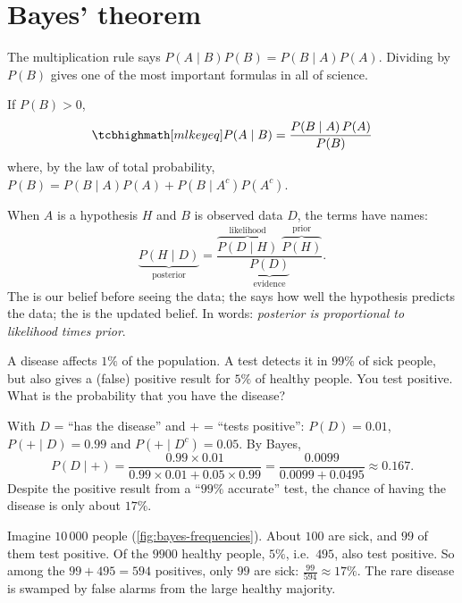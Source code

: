 \section{Bayes' theorem}\label{sec:bayes}

The multiplication rule says $P(A \mid B)P(B) = P(B \mid A)P(A)$. Dividing by
$P(B)$ gives one of the most important formulas in all of science.

\begin{theorem}\label{thm:bayes}
If $P(B) > 0$,
\[
  \keyeq{P(A \mid B) = \frac{P(B \mid A)\,P(A)}{P(B)}}
\]
where, by the law of total probability,
$P(B) = P(B \mid A)P(A) + P(B \mid A^c)P(A^c)$.
\end{theorem}

\begin{notation}
When $A$ is a hypothesis $H$ and $B$ is observed data $D$, the terms have names:
\[
  \underbrace{P(H \mid D)}_{\text{posterior}}
  = \frac{\overbrace{P(D \mid H)}^{\text{likelihood}}\;
    \overbrace{P(H)}^{\text{prior}}}{\underbrace{P(D)}_{\text{evidence}}} .
\]
The  is our belief before seeing the data; the 
says how well the hypothesis predicts the data; the  is the
updated belief. In words: \emph{posterior is proportional to likelihood times
prior}.
\end{notation}

\begin{example}\label{ex:medical-test}
A disease affects $1\%$ of the population. A test detects it in $99\%$ of sick
people, but also gives a (false) positive result for $5\%$ of healthy people.
You test positive. What is the probability that you have the disease?

\sol With $D$ = ``has the disease'' and $+$ = ``tests positive'':
$P(D) = 0.01$, $P(+ \mid D) = 0.99$ and $P(+ \mid D^c) = 0.05$. By Bayes,
\[
  P(D \mid +) = \frac{0.99\times0.01}{0.99\times0.01 + 0.05\times0.99}
  = \frac{0.0099}{0.0099 + 0.0495} \approx 0.167 .
\]
Despite the positive result from a ``$99\%$ accurate'' test, the chance of
having the disease is only about $17\%$.
\end{example}

\begin{intuition}
Imagine $10\,000$ people (\cref{fig:bayes-frequencies}). About $100$ are sick, and
$99$ of them test positive. Of the $9900$ healthy people, $5\%$, i.e.\ $495$, also
test positive. So among the $99 + 495 = 594$ positives, only $99$ are sick:
$\frac{99}{594} \approx 17\%$. The rare disease is swamped by false alarms from
the large healthy majority.
\end{intuition}

